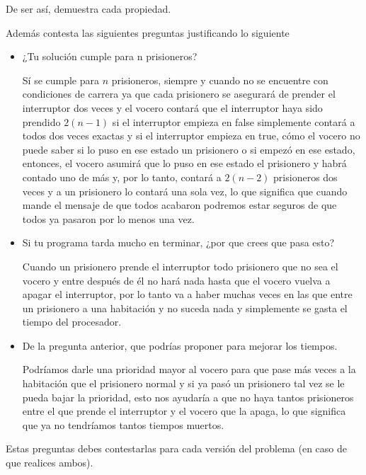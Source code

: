 \documentclass[10pt,letterpaper]{article}
\begin{document}
De ser así, demuestra cada propiedad.


\hspace{3mm}

Además contesta las siguientes preguntas justificando lo siguiente

\begin{itemize}
    \item ¿Tu solución cumple para n prisioneros?

    Sí se cumple para $n$ prisioneros, siempre y cuando no se encuentre con condiciones de carrera ya que cada prisionero se asegurará de prender el interruptor dos veces y el vocero contará que el interruptor haya sido prendido $2(n - 1)$ si el interruptor empieza en false simplemente contará a todos dos veces exactas y si el interruptor empieza en true, cómo el vocero no puede saber si lo puso en ese estado un prisionero o si empezó en ese estado, entonces, el vocero asumirá que lo puso en ese estado el prisionero y habrá contado uno de más y, por lo tanto, contará a $2 (n-2)$ prisioneros dos veces y a un prisionero lo contará una sola vez, lo que significa que cuando mande el mensaje de que todos acabaron podremos estar seguros de que todos ya pasaron por lo menos una vez.

    \item Si tu programa tarda mucho en terminar, ¿por que crees que pasa esto? 

    Cuando un prisionero prende el interruptor todo prisionero que no sea el vocero y entre después de él no hará nada hasta que el vocero vuelva a apagar el interruptor, por lo tanto va a haber muchas veces en las que entre un prisionero a una habitación y no suceda nada y simplemente se gasta el tiempo del procesador.

    \item De la pregunta anterior, que podrías proponer para mejorar los tiempos.

    Podríamos darle una prioridad mayor al vocero para que pase más veces a la habitación que el prisionero normal y si ya pasó un prisionero tal vez se le pueda bajar la prioridad, esto nos ayudaría a que no haya tantos prisioneros entre el que prende el interruptor y el vocero que la apaga, lo que significa que ya no tendríamos tantos tiempos muertos.
\end{itemize}

Estas preguntas debes contestarlas para cada versión del problema (en caso de que realices ambos).

\hspace{3mm}
\end{document}
